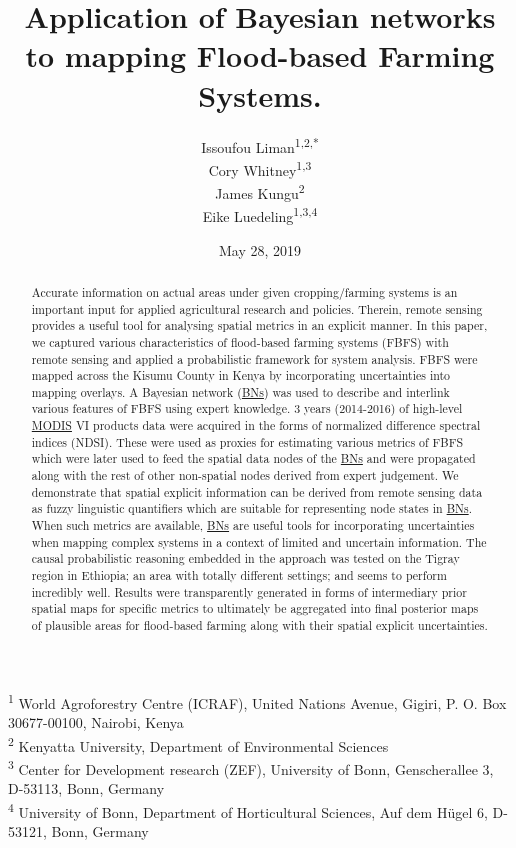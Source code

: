 \documentclass[12pt,oneside]{article}
\title{Application of Bayesian networks to mapping Flood-based Farming Systems.}
\author{Issoufou Liman\textsuperscript{1,2,*} \\ Cory Whitney\textsuperscript{1,3} \\ James Kungu\textsuperscript{2} \\ Eike Luedeling\textsuperscript{1,3,4}}
\date{May 28, 2019}
\begin{document}
\maketitle
\begin{abstract}
Accurate information on actual areas under given cropping/farming systems is an important input for applied agricultural research and policies. Therein, remote sensing provides a useful tool for analysing spatial metrics in an explicit manner. In this paper, we captured various characteristics of flood-based farming systems (FBFS) with remote sensing and applied a probabilistic framework for system analysis. FBFS were mapped across the Kisumu County in Kenya by incorporating uncertainties into mapping overlays. A Bayesian network (\href{https://en.wikipedia.org/wiki/Bayesian_network}{BNs}) was used to describe and interlink various features of FBFS using expert knowledge. 3 years (2014-2016) of high-level \href{https://terra.nasa.gov/about/terra-instruments/modis}{MODIS} VI products data were acquired in the forms of normalized difference spectral indices (NDSI). These were used as proxies for estimating various metrics of FBFS which were later used to feed the spatial data nodes of the \href{https://en.wikipedia.org/wiki/Bayesian_network}{BNs} and were propagated along with the rest of other non-spatial nodes derived from expert judgement. We demonstrate that spatial explicit information can be derived from remote sensing data as fuzzy linguistic quantifiers which are suitable for representing node states in \href{https://en.wikipedia.org/wiki/Bayesian_network}{BNs}. When such metrics are available, \href{https://en.wikipedia.org/wiki/Bayesian_network}{BNs} are useful tools for incorporating uncertainties when mapping complex systems in a context of limited and uncertain information. The causal probabilistic reasoning embedded in the approach was tested on the Tigray region in Ethiopia; an area with totally different settings; and seems to perform incredibly well. Results were transparently generated in forms of intermediary prior spatial maps for specific metrics to ultimately be aggregated into final posterior maps of plausible areas for flood-based farming along with their spatial explicit uncertainties.
\end{abstract}

{
\hypersetup{linkcolor=black}
\setcounter{tocdepth}{5}
\tableofcontents
}
\textsuperscript{1} World Agroforestry Centre (ICRAF), United Nations Avenue, Gigiri, P. O. Box 30677-00100, Nairobi, Kenya\\
\textsuperscript{2} Kenyatta University, Department of Environmental Sciences\\
\textsuperscript{3} Center for Development research (ZEF), University of Bonn, Genscherallee 3, D-53113, Bonn, Germany\\
\textsuperscript{4} University of Bonn, Department of Horticultural Sciences, Auf dem Hügel 6, D-53121, Bonn, Germany
\end{document}
